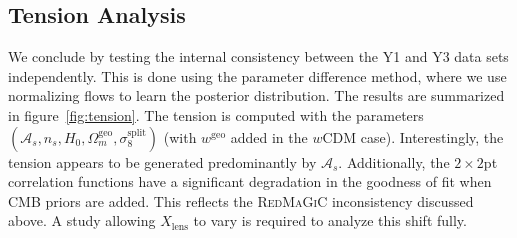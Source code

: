 \subsection{Tension Analysis}
We conclude by testing the internal consistency between the Y1 and Y3 data sets independently. This is done using the parameter difference method, where we use normalizing flows to learn the posterior distribution. The results are summarized in figure~\ref{fig:tension}. The tension is computed with the parameters $(\mathcal{A}_s,n_s,H_0,\Omega_m^{\mathrm{geo}},\sigma_8^\mathrm{split})$ (with $w^{\mathrm{geo}}$ added in the $w$CDM case). Interestingly, the tension appears to be generated predominantly by $\mathcal{A}_s$. Additionally, the $2\times2$pt correlation functions have a significant degradation in the goodness of fit when CMB priors are added. This reflects the \textsc{RedMaGiC} inconsistency discussed above. A study allowing $X_\mathrm{lens}$ to vary is required to analyze this shift fully.

